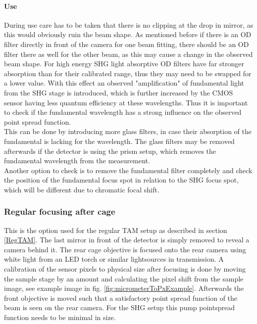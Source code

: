 \documentclass[twoside,openright]{scrreprt}
\begin{document}
\paragraph{Use}
During use care has to be taken that there is no clipping at the drop in mirror, as this would obviously ruin the beam shape. As mentioned before if there is an OD filter directly in front of the camera for one beam fitting, there should be an OD filter there as well for the other beam, as this may cause a change in the observed beam shape. For high energy SHG light absorptive OD filters have far stronger absorption than for their calibrated range, thus they may need to be swapped for a lower value. With this effect an observed "amplification" of fundamental light from the SHG stage is introduced, which is further increased by the CMOS sensor having less quantum efficiency at these wavelengths. Thus it is important to check if the fundamental wavelength has a strong influence on the observed point spread function.\\
This can be done by introducing more glass filters, in case their absorption of the fundamental is lacking for the wavelength. The glass filters may be removed afterwards if the detector is using the prism setup, which removes the fundamental wavelength from the measurement.\\
Another option to check is to remove the fundamental filter completely and check the position of the fundamental focus spot in relation to the SHG focus spot, which will be different due to chromatic focal shift.

\subsubsection{Regular focusing after cage}\label{regRearFocus}
This is the option used for the regular TAM setup as described in section \ref{RegTAM}. The last mirror in front of the detector is simply removed to reveal a camera behind it. The rear cage objective is focused onto the rear camera using white light from an LED torch or similar lightsources in transmission. A calibration of the sensor pixels to physical size after focusing is done by moving the sample stage by an amount and calculating the pixel shift from the sample image, see example image in fig. \ref{fig:micrometerToPxExample}. Afterwards the front objective is moved such that a satisfactory point spread function of the beam is seen on the rear camera. For the SHG setup this pump pointspread function needs to be minimal in size.
\end{document}

